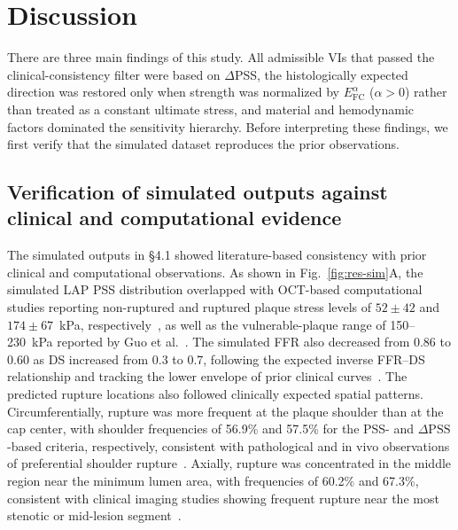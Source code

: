 \documentclass[master,english,final]{kaist-ucs}
\begin{document}
\chapter{Discussion}

There are three main findings of this study. All admissible VIs that passed the clinical-consistency filter were based on $\Delta$PSS, the histologically expected direction was restored only when strength was normalized by $E_\mathrm{FC}^{\alpha}$ ($\alpha>0$) rather than treated as a constant ultimate stress, and material and hemodynamic factors dominated the sensitivity hierarchy. Before interpreting these findings, we first verify that the simulated dataset reproduces the prior observations.

\section{Verification of simulated outputs against clinical and computational evidence}
The simulated outputs in \S4.1 showed literature-based consistency with prior clinical and computational observations. As shown in Fig.~\ref{fig:res-sim}A, the simulated LAP PSS distribution overlapped with OCT-based computational studies reporting non-ruptured and ruptured plaque stress levels of $52 \pm 42$ and $174 \pm 67$~kPa, respectively~\cite{milzi2021}, as well as the vulnerable-plaque range of 150--230~kPa reported by Guo et al.~\cite{guo2026pss}. The simulated FFR also decreased from 0.86 to 0.60 as DS increased from 0.3 to 0.7, following the expected inverse FFR--DS relationship and tracking the lower envelope of prior clinical curves~\cite{kristensen_ffr_ds, dai_ffr_ds, nijjer_ffr_ds, lee_ffr_ds}. The predicted rupture locations also followed clinically expected spatial patterns. Circumferentially, rupture was more frequent at the plaque shoulder than at the cap center, with shoulder frequencies of 56.9\% and 57.5\% for the PSS- and $\Delta\mathrm{PSS}$-based criteria, respectively, consistent with pathological and in vivo observations of preferential shoulder rupture~\cite{richardson1989, maehara2002}. Axially, rupture was concentrated in the middle region near the minimum lumen area, with frequencies of 60.2\% and 67.3\%, consistent with clinical imaging studies showing frequent rupture near the most stenotic or mid-lesion segment~\cite{chung2017_LA, maehara2002}.
\end{document}

